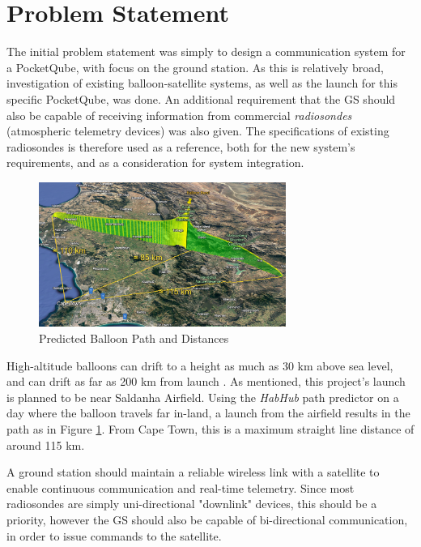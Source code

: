 \graphicspath{{./figures/}}

\section{Problem Statement}

The initial problem statement was simply to design a communication system for a \mbox{PocketQube}, with focus on the ground station. As this is relatively broad, investigation of existing balloon-satellite systems, as well as the launch for this specific PocketQube, was done. An additional requirement that the GS should also be capable of receiving information from commercial \textit{radiosondes} (atmospheric telemetry devices) was also given. The specifications of existing radiosondes is therefore used as a reference, both for the new system's requirements, and as a consideration for system integration.

\begin{figure}[!htb]
  \centering
  \includegraphics[width=0.72\textwidth]{balloon_path_3d}
  \caption{Predicted Balloon Path and Distances}
  \label{fig:balloon_path}
\end{figure}

High-altitude balloons can drift to a height as much as 30 km above sea level, and can drift as far as 200 km from launch \cite{site-weatherWeatherBalloons}. As mentioned, this project's launch is planned to be near Saldanha Airfield. Using the \textit{HabHub} path predictor \cite{site-habHub} on a day where the balloon travels far in-land, a launch from the airfield results in the path as in Figure \ref{fig:balloon_path}. From Cape Town, this is a maximum straight line distance of around 115 km. 

A ground station should maintain a reliable wireless link with a satellite to enable continuous communication and real-time telemetry. Since most radiosondes are simply uni-directional "downlink" devices, this should be a priority, however the GS should also be capable of bi-directional communication, in order to issue commands to the satellite.